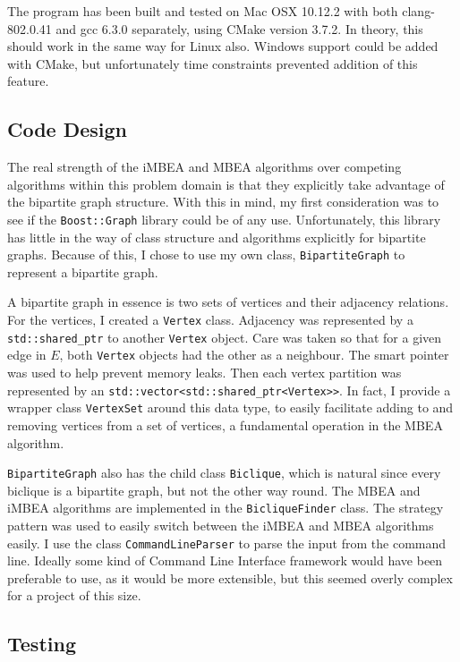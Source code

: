 The program has been built and tested on Mac OSX 10.12.2 with both clang-802.0.41 and gcc 6.3.0 separately, using CMake version 3.7.2.
In theory, this should work in the same way for Linux also.
Windows support could be added with CMake, but unfortunately time constraints prevented addition of this feature.

\subsection{Code Design}

The real strength of the iMBEA and MBEA algorithms over competing algorithms within this problem domain is that they explicitly take advantage of the bipartite graph structure.
With this in mind, my first consideration was to see if the \texttt{Boost::Graph} library could be of any use.
Unfortunately, this library has little in the way of class structure and algorithms explicitly for bipartite graphs.
Because of this, I chose to use my own class, \texttt{BipartiteGraph} to represent a bipartite graph.

A bipartite graph in essence is two sets of vertices and their adjacency relations.
For the vertices, I created a \texttt{Vertex} class.
Adjacency was represented by a \texttt{std::shared\_ptr} to another \texttt{Vertex} object.
Care was taken so that for a given edge in $E$, both \texttt{Vertex} objects had the other as a neighbour.
The smart pointer was used to help prevent memory leaks.
Then each vertex partition was represented by an \texttt{std::vector<std::shared\_ptr<Vertex>{>}}.
In fact, I provide a wrapper class \texttt{VertexSet} around this data type, to easily facilitate adding to and removing vertices from a set of vertices, a fundamental operation in the MBEA algorithm.

\texttt{BipartiteGraph} also has the child class \texttt{Biclique}, which is natural since every biclique is a bipartite graph, but not the other way round.
The MBEA and iMBEA algorithms are implemented in the \texttt{BicliqueFinder} class.
The strategy pattern was used to easily switch between the iMBEA and MBEA algorithms easily.
I use the class \texttt{CommandLineParser} to parse the input from the command line.
Ideally some kind of Command Line Interface framework would have been preferable to use, as it would be more extensible, but this seemed overly complex for a project of this size.

\subsection{Testing}

